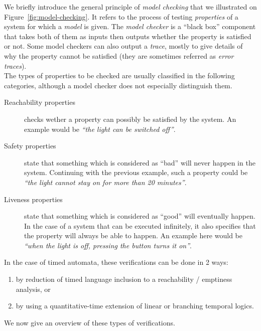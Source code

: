 We briefly introduce the general principle of \emph{model checking} that we illustrated on Figure~\ref{fig:model-checking}. It refers to the process of testing \emph{properties} of a system for which a \emph{model} is given. The \emph{model checker} is a ``black box'' component that takes both of them as inputs then outputs whether the property is satisfied or not. Some model checkers can also output a \emph{trace}, mostly to give details of why the property cannot be satisfied (they are sometimes referred as \emph{error traces}).\\

The types of properties to be checked are usually classified in the following categories, although a model checker does not especially distinguish them.
\begin{description}
  
  \item[Reachability properties] checks wether a property can possibly be satisfied by the system. An example would be \emph{``the light can be switched off''}.
  
  \item[Safety properties] state that something which is considered as ``bad'' will never happen in the system. Continuing with the previous example, such a property could be \emph{``the light cannot stay on for more than 20 minutes''}.
  
  \item[Liveness properties] state that something which is considered as ``good'' will eventually happen. In the case of a system that can be executed infinitely, it also specifies that the property will always be able to happen. An example here would be \emph{``when the light is off, pressing the button turns it on''}.
  
\end{description}

In the case of timed automata, these verifications can be done in 2 ways:
\begin{enumerate}
  
  \item by reduction of timed language inclusion to a reachability / emptiness analysis, or
  
  \item by using a quantitative-time extension of linear or branching temporal logics.
  
\end{enumerate}

We now give an overview of these types of verifications.\\

